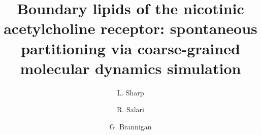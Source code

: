 \documentclass[final,3p,times,twocolumn]{elsarticle}
\begin{document}
\begin{frontmatter}



\title{Boundary lipids of the nicotinic acetylcholine receptor: spontaneous partitioning via coarse-grained molecular dynamics simulation} 

\author[ccib]{L. Sharp} 
\author[ccib,wasu]{R. Salari}
\author[ccib,physics]{G. Brannigan}
\address[ccib]{Center for Computational and Integrative Biology, Rutgers University-Camden, Camden, NJ}
\address[wasu]{Now at Washington University School of Medicine in St Louis}
\address[physics]{Department of Physics, Rutgers University-Camden, Camden, NJ}


\end{frontmatter}
\end{document}
